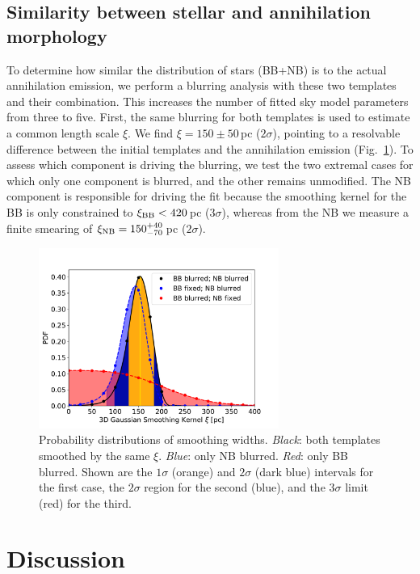 \documentclass[doublespace,nopageskip]{VTthesis} %
\begin{document}
\subsection{Similarity between stellar and annihilation morphology}\label{sec:blurring_analysis}
%
To determine how similar the distribution of stars (BB+NB) is to the actual annihilation emission, we perform a blurring analysis with these two templates and their combination.
%
This increases the number of fitted sky model parameters from three to five.
%
First, the same blurring for both templates is used to estimate a common length scale $\xi$.
%
We find $\xi = 150 \pm 50$\,pc ($2\sigma$), pointing to a resolvable difference between the initial templates and the annihilation emission (Fig. \,\ref{fig:blur}).
%
To assess which component is driving the blurring, we test the two extremal cases for which only one component is blurred, and the other remains unmodified.
%
The NB component is responsible for driving the fit because the smoothing kernel for the BB is only constrained to $\xi_{\rm BB} < 420$\,pc ($3\sigma$), whereas from the NB we measure a finite smearing of $\xi_{\rm NB} = 150^{+40}_{-70}$\,pc ($2\sigma$).

\begin{figure}[htb]
	\centering
	\includegraphics[width=0.7\textwidth,trim=0.0in 0.15in 0.4in 0.7in, clip=True]{Figures/511keV/Blurred_bulges3D_PDF_comparison.pdf}
	\caption{Probability distributions of smoothing widths. \textit{Black}: both templates smoothed by the same $\xi$. \textit{Blue}: only NB blurred. \textit{Red}: only BB blurred. Shown are the $1\sigma$ (orange) and $2\sigma$ (dark blue) intervals for the first case, the $2\sigma$ region for the second (blue), and the $3\sigma$ limit (red) for the third.} 
	\label{fig:blur}
\end{figure}


\section{Discussion}\label{sec:discussion_511}
%
\end{document}
